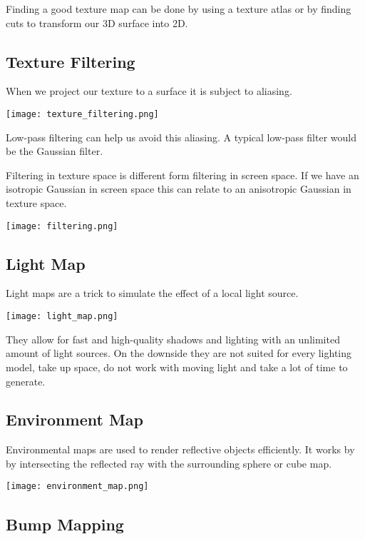 Finding a good texture map can be done by using a texture atlas or by finding cuts to transform our 3D surface into 2D. 


\subsection{Texture Filtering}

When we project our texture to a surface it is subject to aliasing.
\begin{center}
	\texttt{[image: texture\_filtering.png]}
\end{center}

Low-pass filtering can help us avoid this aliasing. A typical low-pass filter would be the Gaussian filter. \medskip

Filtering in texture space is different form filtering in screen space. If we have an isotropic Gaussian in screen space this can relate to an anisotropic Gaussian in texture space.
\begin{center}
	\texttt{[image: filtering.png]}
\end{center}


\subsection{Light Map}

Light maps are a trick to simulate the effect of a local light source.
\begin{center}
	\texttt{[image: light\_map.png]}
\end{center}

They allow for fast and high-quality shadows and lighting with an unlimited amount of light sources. On the downside they are not suited for every lighting model, take up space, do not work with moving light and take a lot of time to generate.


\subsection{Environment Map}

Environmental maps are used to render reflective objects efficiently. It works by by intersecting the reflected ray with the surrounding sphere or cube map.
\begin{center}
	\texttt{[image: environment\_map.png]}
\end{center}


\subsection{Bump Mapping}

